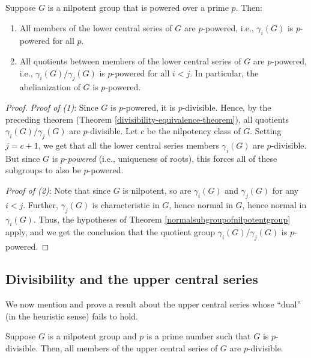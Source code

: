 \documentclass{ucetd}
\begin{document}
\begin{theorem}\label{thm:powering-lcs}
  Suppose $G$ is a nilpotent group that is powered over a prime
  $p$. Then:

  \begin{enumerate}
  \item All members of the lower central series of $G$ are
    $p$-powered, i.e., $\gamma_i(G)$ is $p$-powered for all $p$.
  \item All quotients between members of the lower central series of
    $G$ are $p$-powered, i.e., $\gamma_i(G)/\gamma_j(G)$ is
    $p$-powered for all $i < j$. In particular, the abelianization of
    $G$ is $p$-powered.
  \end{enumerate}
\end{theorem}

\begin{proof}
  {\em Proof of (1)}: Since $G$ is $p$-powered, it is
  $p$-divisible. Hence, by the preceding theorem (Theorem
  \ref{divisibility-equivalence-theorem}), all quotients
  $\gamma_i(G)/\gamma_j(G)$ are $p$-divisible. Let $c$ be the
  nilpotency class of $G$. Setting $j = c + 1$, we get that all the
  lower central series members $\gamma_i(G)$ are $p$-divisible. But
  since $G$ is $p$-{\em powered} (i.e., uniqueness of roots), this
  forces all of these subgroups to also be $p$-powered.

  {\em Proof of (2)}: Note that since $G$ is nilpotent, so are
  $\gamma_i(G)$ and $\gamma_j(G)$ for any $i < j$. Further,
  $\gamma_j(G)$ is characteristic in $G$, hence normal in $G$, hence
  normal in $\gamma_i(G)$. Thus, the hypotheses of Theorem
  \ref{normalsubgroupofnilpotentgroup} apply, and we get the
  conclusion that the quotient group $\gamma_i(G)/\gamma_j(G)$ is
  $p$-powered.
\end{proof}

\subsection{Divisibility and the upper central series}

We now mention and prove a result about the upper central series whose
``dual'' (in the heuristic sense) fails to hold. %

\begin{theorem}\label{thm:divisibility-upper-central-series}
  Suppose $G$ is a nilpotent group and $p$ is a prime number such that
  $G$ is $p$-divisible. Then, all members of the upper central series
  of $G$ are $p$-divisible.
\end{theorem}
\end{document}
